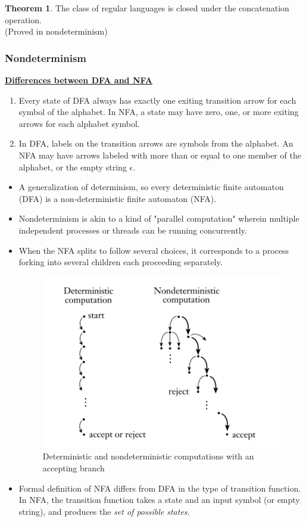 \documentclass[11pt]{article}
\theoremstyle{definition}
\newtheorem{thm}{Theorem}[section]
\begin{document}
\begin{thm}
The class of regular languages is closed under the concatenation operation.\\
(Proved in nondeterminism)
\end{thm}

\subsubsection{Nondeterminism}
\textbf{\underline{Differences between DFA and NFA}}
    \begin{enumerate}
        \item Every state of DFA always has exactly one exiting transition arrow for each symbol of the alphabet. In NFA, a state may have zero, one, or more exiting arrows for each alphabet symbol.
        \item In DFA, labels on the transition arrows are symbols from the alphabet. An NFA may have arrows labeled with more than or equal to one member of the alphabet, or the empty string $\epsilon$.
    \end{enumerate}
\begin{itemize}[leftmargin=*]
    \item A generalization of determinism, so every deterministic finite automaton (DFA) is a non-deterministic finite automaton (NFA).
    \item Nondeterminism is akin to a kind of "parallel computation" wherein multiple independent processes or threads can be running concurrently. 
    \item When the NFA splits to follow several choices, it corresponds to a process forking into several children each proceeding separately.
    \begin{figure}[h]
    	\centering
    	\includegraphics[width=0.5\linewidth]{nfa.png}
    	\caption{Deterministic and nondeterministic computations with an accepting branch}
    	\label{fig}
    \end{figure}
    \item Formal definition of NFA differs from DFA in the type of transition function. In NFA, the transition function takes a state and an input symbol (or empty string), and produces the \textit{set of possible states.}
\end{itemize}
\end{document}
